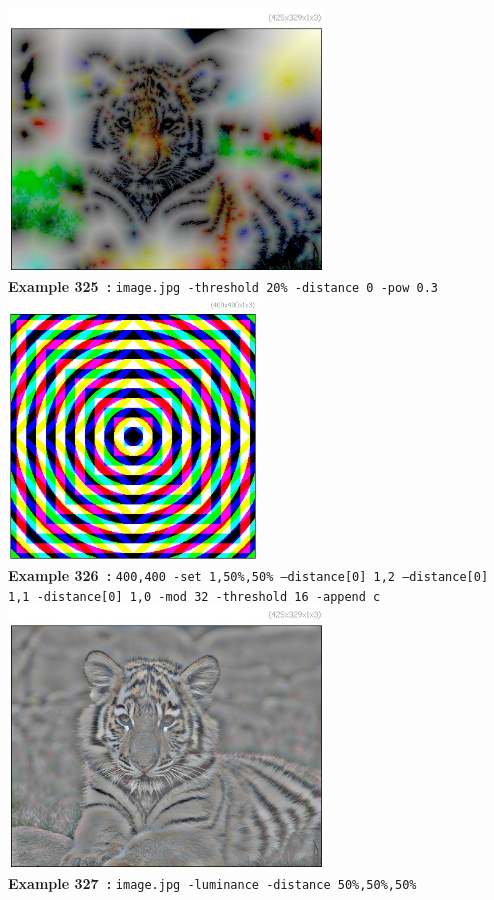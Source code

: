 \documentclass[a4paper,11pt,twoside]{book}
\begin{document}
\begin{center}\includegraphics[keepaspectratio=true,height=7cm,width=\textwidth]{img/gmic_def325.jpg}\\
{\footnotesize \textbf{Example 325~:} \texttt{image.jpg -threshold 20\% -distance 0 -pow 0.3}}
\\\includegraphics[keepaspectratio=true,height=7cm,width=\textwidth]{img/gmic_def326.jpg}\\
{\footnotesize \textbf{Example 326~:} \texttt{400,400 -set 1,50\%,50\% --distance[0] 1,2 --distance[0] 1,1 -distance[0] 1,0 -mod 32 -threshold 16 -append c}}
\\\includegraphics[keepaspectratio=true,height=7cm,width=\textwidth]{img/gmic_def327.jpg}\\
{\footnotesize \textbf{Example 327~:} \texttt{image.jpg -luminance -distance 50\%,50\%,50\%}}
\end{center}
\end{document}
